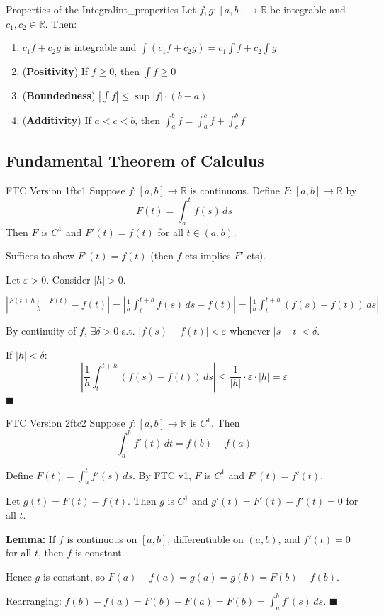 \documentclass[11pt, letterpaper, openany]{book}
\renewenvironment{proof}[1][\proofname]{%
  \tcolorbox[blanker, breakable, left=1em,
    before skip=1em, after skip=1em,
    borderline west={2pt}{0pt}{MagicTeal!50},
    colback=MagicCream,
    before upper={\textcolor{MagicTeal}{\sffamily\bfseries #1.}\space}
  ]%
}{%
  \hfill\textcolor{MagicTeal}{\ensuremath{\blacksquare}}\endtcolorbox%
}
\begin{document}
\begin{thm}{Properties of the Integral}{int_properties}
Let $f, g: [a,b] \to \mathbb{R}$ be integrable and $c_1, c_2 \in \mathbb{R}$. Then:
\begin{enumerate}
    \item $c_1 f + c_2 g$ is integrable and $\int (c_1 f + c_2 g) = c_1 \int f + c_2 \int g$
    \item (\textbf{Positivity}) If $f \geq 0$, then $\int f \geq 0$
    \item (\textbf{Boundedness}) $|\int f| \leq \sup|f| \cdot (b-a)$
    \item (\textbf{Additivity}) If $a < c < b$, then $\int_a^b f = \int_a^c f + \int_c^b f$
\end{enumerate}
\end{thm}

\subsection{Fundamental Theorem of Calculus}

\begin{thm}{FTC Version 1}{ftc1}
Suppose $f: [a,b] \to \mathbb{R}$ is continuous. Define $F: [a,b] \to \mathbb{R}$ by
\[F(t) = \int_a^t f(s) \, ds\]
Then $F$ is $C^1$ and $F'(t) = f(t)$ for all $t \in (a,b)$.
\end{thm}

\begin{proof}
Suffices to show $F'(t) = f(t)$ (then $f$ cts implies $F'$ cts).

Let $\varepsilon > 0$. Consider $|h| > 0$.

$\left|\frac{F(t+h) - F(t)}{h} - f(t)\right| = \left|\frac{1}{h}\int_t^{t+h} f(s) \, ds - f(t)\right| = \left|\frac{1}{h}\int_t^{t+h} (f(s) - f(t)) \, ds\right|$

By continuity of $f$, $\exists \delta > 0$ s.t. $|f(s) - f(t)| < \varepsilon$ whenever $|s - t| < \delta$.

If $|h| < \delta$:
\[\left|\frac{1}{h}\int_t^{t+h} (f(s) - f(t)) \, ds\right| \leq \frac{1}{|h|} \cdot \varepsilon \cdot |h| = \varepsilon\]
\end{proof}

\begin{thm}{FTC Version 2}{ftc2}
Suppose $f: [a,b] \to \mathbb{R}$ is $C^1$. Then
\[\int_a^b f'(t) \, dt = f(b) - f(a)\]
\end{thm}

\begin{proof}
Define $F(t) = \int_a^t f'(s) \, ds$. By FTC v1, $F$ is $C^1$ and $F'(t) = f'(t)$.

Let $g(t) = F(t) - f(t)$. Then $g$ is $C^1$ and $g'(t) = F'(t) - f'(t) = 0$ for all $t$.

\textbf{Lemma:} If $f$ is continuous on $[a,b]$, differentiable on $(a,b)$, and $f'(t) = 0$ for all $t$, then $f$ is constant.

Hence $g$ is constant, so $F(a) - f(a) = g(a) = g(b) = F(b) - f(b)$.

Rearranging: $f(b) - f(a) = F(b) - F(a) = F(b) = \int_a^b f'(s) \, ds$.
\end{proof}
\end{document}
